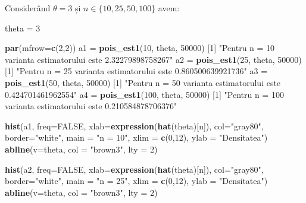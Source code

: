 \documentclass[]{article}
\newenvironment{Shaded}{\begin{snugshade}}{\end{snugshade}}
\newcommand{\KeywordTok}[1]{\textcolor[rgb]{0.13,0.29,0.53}{\textbf{#1}}}
\newcommand{\DataTypeTok}[1]{\textcolor[rgb]{0.13,0.29,0.53}{#1}}
\newcommand{\DecValTok}[1]{\textcolor[rgb]{0.00,0.00,0.81}{#1}}
\newcommand{\StringTok}[1]{\textcolor[rgb]{0.31,0.60,0.02}{#1}}
\newcommand{\OtherTok}[1]{\textcolor[rgb]{0.56,0.35,0.01}{#1}}
\newcommand{\NormalTok}[1]{#1}
\begin{document}
Considerând \(\theta = 3\) și \(n\in\{10,25,50,100\}\) avem:

\begin{Shaded}
\begin{Highlighting}[]
\NormalTok{theta =}\StringTok{ }\DecValTok{3}

\KeywordTok{par}\NormalTok{(}\DataTypeTok{mfrow=}\KeywordTok{c}\NormalTok{(}\DecValTok{2}\NormalTok{,}\DecValTok{2}\NormalTok{))}
\NormalTok{a1 =}\StringTok{ }\KeywordTok{pois_est1}\NormalTok{(}\DecValTok{10}\NormalTok{, theta, }\DecValTok{50000}\NormalTok{)}
\NormalTok{[}\DecValTok{1}\NormalTok{] }\StringTok{"Pentru n = 10 varianta estimatorului este 2.32279898758267"}
\NormalTok{a2 =}\StringTok{ }\KeywordTok{pois_est1}\NormalTok{(}\DecValTok{25}\NormalTok{, theta, }\DecValTok{50000}\NormalTok{)}
\NormalTok{[}\DecValTok{1}\NormalTok{] }\StringTok{"Pentru n = 25 varianta estimatorului este 0.860500639921736"}
\NormalTok{a3 =}\StringTok{ }\KeywordTok{pois_est1}\NormalTok{(}\DecValTok{50}\NormalTok{, theta, }\DecValTok{50000}\NormalTok{)}
\NormalTok{[}\DecValTok{1}\NormalTok{] }\StringTok{"Pentru n = 50 varianta estimatorului este 0.424701461962554"}
\NormalTok{a4 =}\StringTok{ }\KeywordTok{pois_est1}\NormalTok{(}\DecValTok{100}\NormalTok{, theta, }\DecValTok{50000}\NormalTok{)}
\NormalTok{[}\DecValTok{1}\NormalTok{] }\StringTok{"Pentru n = 100 varianta estimatorului este 0.210584878706376"}


\KeywordTok{hist}\NormalTok{(a1, }\DataTypeTok{freq=}\OtherTok{FALSE}\NormalTok{, }\DataTypeTok{xlab=}\KeywordTok{expression}\NormalTok{(}\KeywordTok{hat}\NormalTok{(theta)[n]), }
     \DataTypeTok{col=}\StringTok{"gray80"}\NormalTok{, }\DataTypeTok{border=}\StringTok{"white"}\NormalTok{, }\DataTypeTok{main =} \StringTok{"n = 10"}\NormalTok{, }\DataTypeTok{xlim =} \KeywordTok{c}\NormalTok{(}\DecValTok{0}\NormalTok{,}\DecValTok{12}\NormalTok{),}
     \DataTypeTok{ylab =} \StringTok{"Densitatea"}\NormalTok{)}
\KeywordTok{abline}\NormalTok{(}\DataTypeTok{v=}\NormalTok{theta, }\DataTypeTok{col =} \StringTok{"brown3"}\NormalTok{, }\DataTypeTok{lty =} \DecValTok{2}\NormalTok{)}

\KeywordTok{hist}\NormalTok{(a2, }\DataTypeTok{freq=}\OtherTok{FALSE}\NormalTok{, }\DataTypeTok{xlab=}\KeywordTok{expression}\NormalTok{(}\KeywordTok{hat}\NormalTok{(theta)[n]), }
     \DataTypeTok{col=}\StringTok{"gray80"}\NormalTok{, }\DataTypeTok{border=}\StringTok{"white"}\NormalTok{, }\DataTypeTok{main =} \StringTok{"n = 25"}\NormalTok{, }\DataTypeTok{xlim =} \KeywordTok{c}\NormalTok{(}\DecValTok{0}\NormalTok{,}\DecValTok{12}\NormalTok{),}
     \DataTypeTok{ylab =} \StringTok{"Densitatea"}\NormalTok{)}
\KeywordTok{abline}\NormalTok{(}\DataTypeTok{v=}\NormalTok{theta, }\DataTypeTok{col =} \StringTok{"brown3"}\NormalTok{, }\DataTypeTok{lty =} \DecValTok{2}\NormalTok{)}


\end{Highlighting}
\end{Shaded}
\end{document}
